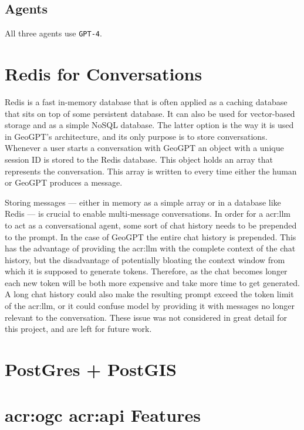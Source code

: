 \subsection{Agents}

All three agents use \texttt{GPT-4}.


\section{Redis for Conversations}

Redis \citep{sanfilippoRedisRealtimeData2009} is a fast in-memory database that is often applied as a caching database that sits on top of some persistent database. It can also be used for vector-based storage and as a simple NoSQL database. The latter option is the way it is used in GeoGPT's architecture, and its only purpose is to store conversations. Whenever a user starts a conversation with GeoGPT an object with a unique session ID is stored to the Redis database. This object holds an array that represents the conversation. This array is written to every time either the human or GeoGPT produces a message.

Storing messages --- either in memory as a simple array or in a database like Redis --- is crucial to enable multi-message conversations. In order for a \gls{acr:llm} to act as a conversational agent, some sort of chat history needs to be prepended to the prompt. In the case of GeoGPT the entire chat history is prepended. This has the advantage of providing the \gls{acr:llm} with the complete context of the chat history, but the disadvantage of potentially bloating the context window from which it is supposed to generate tokens. Therefore, as the chat becomes longer each new token will be both more expensive and take more time to get generated. A long chat history could also make the resulting prompt exceed the token limit of the \gls{acr:llm}, or it could confuse model by providing it with messages no longer relevant to the conversation. These issue was not considered in great detail for this project, and are left for future work.




\section{PostGres + PostGIS}


\section[OGC API Features]{\acrshort{acr:ogc} \acrshort{acr:api} Features}

